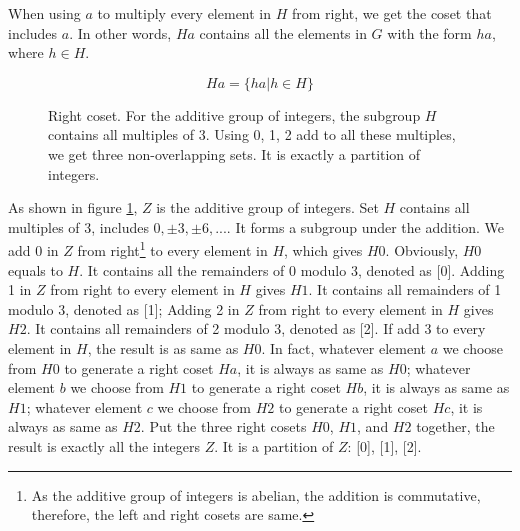 \documentclass[b5paper]{article}
\begin{document}
When using $a$ to multiply every element in $H$ from right, we get the coset that includes $a$. In other words, $Ha$ contains all the elements in $G$ with the form $ha$, where $h \in H$.

\[
Ha = \{ha | h \in H\}
\]

\begin{figure}[htbp]
\centering
{}
\caption{Right coset. For the additive group of integers, the subgroup $H$ contains all multiples of 3. Using 0, 1, 2 add to all these multiples, we get three non-overlapping sets. It is exactly a partition of integers.}
\label{fig:right-cosets-Z3}
\end{figure}

As shown in figure \ref{fig:right-cosets-Z3}, $Z$ is the additive group of integers. Set $H$ contains all multiples of 3, includes $0, \pm 3, \pm 6, ...$. It forms a subgroup under the addition. We add 0 in $Z$ from right\footnote{As the additive group of integers is abelian, the addition is commutative, therefore, the left and right cosets are same.} to every element in $H$, which gives $H0$. Obviously, $H0$ equals to $H$. It contains all the remainders of 0 modulo 3, denoted as [0]. Adding 1 in $Z$ from right to every element in $H$ gives $H1$. It contains all remainders of 1 modulo 3, denoted as [1]; Adding 2 in $Z$ from right to every element in $H$ gives $H2$. It contains all remainders of 2 modulo 3, denoted as [2]. If add 3 to every element in $H$, the result is as same as $H0$. In fact, whatever element $a$ we choose from $H0$ to generate a right coset $Ha$, it is always as same as $H0$; whatever element $b$ we choose from $H1$ to generate a right coset $Hb$, it is always as same as $H1$; whatever element $c$ we choose from $H2$ to generate a right coset $Hc$, it is always as same as $H2$. Put the three right cosets $H0$, $H1$, and $H2$ together, the result is exactly all the integers $Z$. It is a partition of $Z$: [0], [1], [2].
\end{document}
